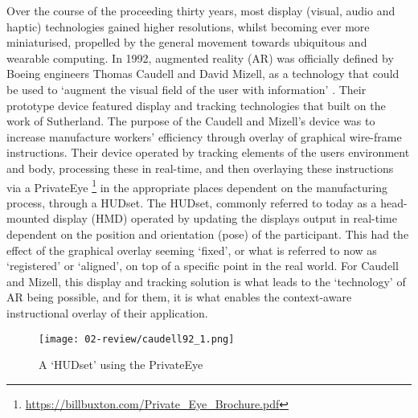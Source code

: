 Over the course of the proceeding thirty years, most display (visual, audio and haptic) technologies gained higher resolutions, whilst becoming ever more miniaturised, propelled by the general movement towards ubiquitous and wearable computing. In 1992, augmented reality (AR) was officially defined by Boeing engineers Thomas Caudell and David Mizell, as a technology that could be used to `augment the visual field of the user with information' \citeyearpar{caudell1992}. Their prototype device featured display and tracking technologies that built on the work of Sutherland. The purpose of the Caudell and Mizell's device was to increase manufacture workers' efficiency through overlay of graphical wire-frame instructions. Their device operated by tracking elements of the users environment and body, processing these in real-time, and then overlaying these instructions via a PrivateEye \footnote{\url{https://billbuxton.com/Private_Eye_Brochure.pdf}} in the appropriate places dependent on the manufacturing process, through a HUDset. The HUDset, commonly referred to today as a head-mounted display (HMD) operated by updating the displays output in real-time dependent on the position and orientation (pose) of the participant. This had the effect of the graphical overlay seeming `fixed', or what is referred to now as `registered' or `aligned', on top of a specific point in the real world. For Caudell and Mizell, this display and tracking solution is what leads to the `technology' of AR being possible, and for them, it is what enables the context-aware instructional overlay of their application.

\begin{figure}
    \centering
    \texttt{[image: 02-review/caudell92\_1.png]}
    \captionsetup{justification=centering,margin=1.5cm}
    \caption{A `HUDset' using the PrivateEye \citep[in][]{caudell1992}}\label{fig: caudellprivateeye}
\end{figure}

